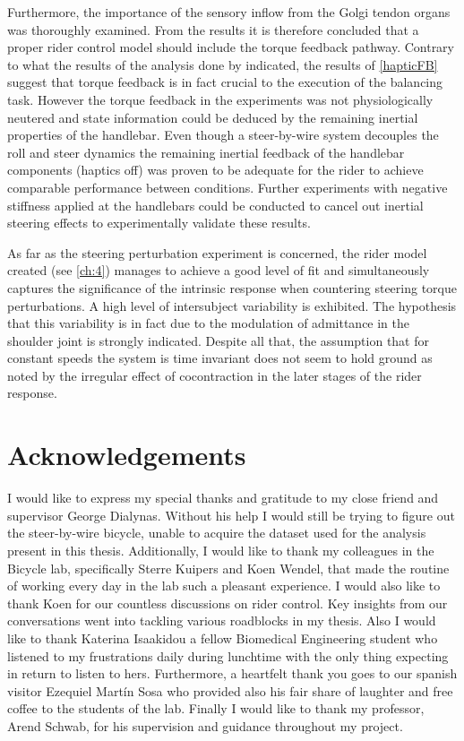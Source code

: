 Furthermore, the importance of the sensory inflow from the Golgi tendon organs was thoroughly examined. From the results it is therefore concluded that a proper rider control model should include the torque feedback pathway. Contrary to what  the results of the analysis done by \citet{dialynaseffect} indicated, the results of \cref{hapticFB} suggest that torque feedback is in fact crucial to the execution of the balancing task. However the torque feedback in the experiments was not physiologically neutered and  state information could be deduced by the remaining inertial properties of the handlebar. Even though a steer-by-wire system decouples the roll and steer dynamics the remaining inertial feedback of the handlebar components (haptics off) was proven to be adequate for the rider to achieve comparable performance between conditions. Further experiments with negative stiffness applied at the handlebars could be conducted to cancel out inertial steering effects to experimentally validate  these results.
 
 
As far as the steering perturbation experiment is concerned, the rider model created (see \cref{ch:4}) manages to achieve a good level of fit and simultaneously captures the significance of the intrinsic response when countering steering torque perturbations. A high level of intersubject variability is exhibited. The hypothesis that this variability is in fact due to the modulation of admittance in the shoulder joint is strongly indicated. Despite all that,  the assumption that for constant speeds the system is time invariant does not seem to hold ground as noted by the irregular effect of cocontraction in the later stages of the rider  response.


\chapter*{Acknowledgements}

I would like to express my special thanks and gratitude to my close friend and supervisor  George Dialynas. Without his help I would still be trying to figure out the steer-by-wire bicycle, unable to acquire the dataset used for the analysis present in this thesis. Additionally, I would like to thank my colleagues in the Bicycle lab, specifically Sterre Kuipers and Koen Wendel, that made the routine of working every day in the lab such a pleasant experience. I would also like to thank Koen  for our countless discussions on rider control. Key insights from our conversations went into tackling various roadblocks in my thesis. Also I would like to thank Katerina Isaakidou a fellow Biomedical Engineering student who listened to my frustrations daily during lunchtime with the only thing expecting in return to listen to hers. Furthermore, a heartfelt thank you goes to our spanish visitor Ezequiel Martín Sosa who provided also his fair share of laughter and free coffee to the students of the lab. Finally I would like to thank my professor, Arend Schwab, for his supervision and guidance throughout my project.